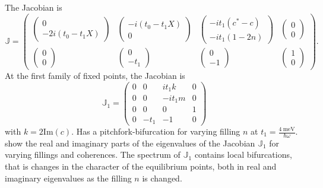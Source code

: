 \documentclass{article}
\begin{document}
The Jacobian is 
\begin{equation}
	\mathds{J} =\begin{pmatrix}
		\begin{pmatrix}
			0 \\ -2i(t_0-t_1X)
		\end{pmatrix} & 
		\begin{pmatrix}
			-i(t_0-t_1X) \\ 0
		\end{pmatrix} &
		\begin{pmatrix}
			-it_1 (c^*-c) \\ -it_1(1-2n)
		\end{pmatrix} &
		\begin{pmatrix}
			0 \\ 0
		\end{pmatrix}
\\
\begin{pmatrix}
	0 \\ 0
\end{pmatrix} & \begin{pmatrix}
0 \\ -t_1
\end{pmatrix}
& \begin{pmatrix}
	0 \\ -1
\end{pmatrix}
& \begin{pmatrix}
	1 \\ 0
\end{pmatrix}
	\end{pmatrix}.
\end{equation}
At the first family of fixed points, the Jacobian is
\begin{equation}
	\mathds{J}_1 =\begin{pmatrix}
		0 & 0 & it_1k & 0\\
		0 & 0 & -it_1 m & 0\\
		0 & 0 & 0 & 1 \\
		0 & -t_1 & -1 & 0
	\end{pmatrix}
\end{equation}
with $k=2\mathrm{Im}(c)$. Has a pitchfork-bifurcation for varying filling $n$ at $t_1=\frac{\SI{4}{\milli\electronvolt}}{\hbar \omega}$. 
 show the real and imaginary parts of the eigenvalues of the Jacobian $\mathbb{J}_1$ for varying fillings and coherences.  
The spectrum of $\mathbb{J}_1$ contains local bifurcations, that is changes in the character of the equilibrium points, both in real and imaginary eigenvalues as the filling $n$ is changed. 
\end{document}
